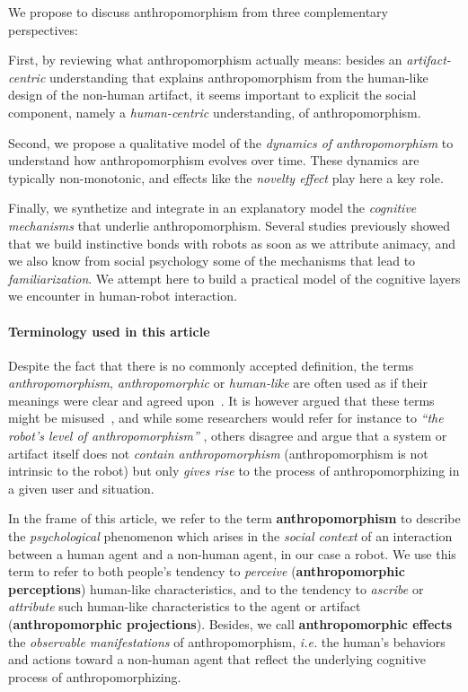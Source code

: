 \documentclass{frontiersSCNS} %
\newcommand{\ie}{\textit{i.e.}\xspace}
\begin{document}
We propose to discuss anthropomorphism from three complementary perspectives: 

First, by reviewing what anthropomorphism actually means: besides an
\emph{artifact-centric} understanding that explains anthropomorphism from the
human-like design of the non-human artifact, it seems important to explicit the
social component, namely a \emph{human-centric} understanding, of
anthropomorphism.

Second, we propose a qualitative model of the \textit{dynamics of
anthropomorphism} to understand how anthropomorphism evolves over time. These
dynamics are typically non-monotonic, and effects like the \emph{novelty effect} play here
a key role.

Finally, we synthetize and integrate in an explanatory model the \emph{cognitive
mechanisms} that underlie anthropomorphism. Several studies previously showed
that we build instinctive bonds with robots as soon as we attribute animacy, and
we also know from social psychology some of the mechanisms that lead to
\emph{familiarization}. We attempt here to build a practical model of the
cognitive layers we encounter in human-robot interaction.


\paragraph{Terminology used in this article\\}

Despite the fact that there is no commonly accepted definition, the terms
\textit{anthropomorphism}, \textit{anthropomorphic} or \textit{human-like} are
often used as if their meanings were clear and agreed
upon~\citep{persson_anthropomorphism_2000}. It is however argued that these
terms might be misused~\citep{duffy_anthropomorphism_2002,epley_when_2008}, and
while some researchers would refer for instance to \textit{``the robot's level
of anthropomorphism''} \citep{bartneck_is_2007,feil-seifer_human-robot_2008},
others disagree and argue that a system or artifact itself does not
\emph{contain anthropomorphism} (anthropomorphism is not intrinsic to the robot)
but only \emph{gives rise} to the process of anthropomorphizing in a given user
and situation.

In the frame of this article, we refer to the term \textbf{anthropomorphism} to
describe the \emph{psychological} phenomenon which arises in the \emph{social
context} of an interaction between a human agent and a non-human agent, in our
case a robot. We use this term to refer to both people's tendency to
\textit{perceive} (\textbf{anthropomorphic perceptions}) human-like
characteristics, and to the tendency to \textit{ascribe} or \textit{attribute}
such human-like characteristics to the agent or artifact
(\textbf{anthropomorphic projections}). Besides, we call {\bf anthropomorphic
effects} the \emph{observable manifestations} of anthropomorphism, \ie the
human's behaviors and actions toward a non-human agent that reflect the
underlying cognitive process of anthropomorphizing.
\end{document}
